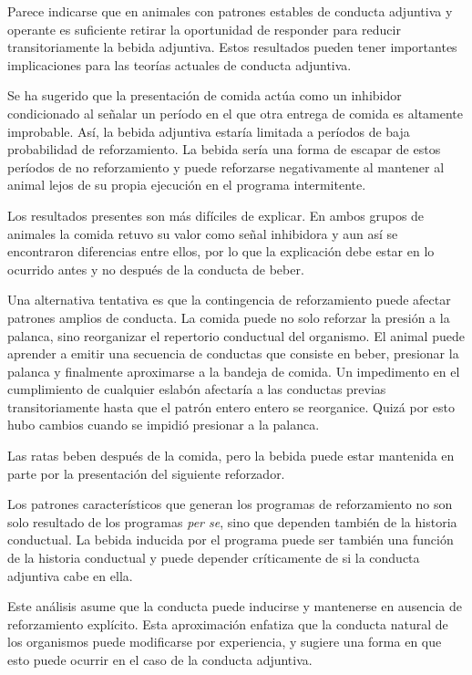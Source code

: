 \documentclass[a4paper,12pt]{article}
\begin{document}
Parece indicarse que en animales con patrones estables de conducta adjuntiva y operante es suficiente retirar la oportunidad de responder para reducir transitoriamente la bebida adjuntiva. Estos resultados pueden tener importantes implicaciones para las teorías actuales de conducta adjuntiva.

Se ha sugerido que la presentación de comida actúa como un inhibidor condicionado al señalar un período en el que otra entrega de comida es altamente improbable. Así, la bebida adjuntiva estaría limitada a períodos de baja probabilidad de reforzamiento. La bebida sería una forma de escapar de estos períodos de no reforzamiento y puede reforzarse negativamente al mantener al animal lejos de su propia ejecución en el programa intermitente.

Los resultados presentes son más difíciles de explicar. En ambos grupos de animales la comida retuvo su valor como señal inhibidora y aun así se encontraron diferencias entre ellos, por lo que la explicación debe estar en lo ocurrido antes y no después de la conducta de beber.

Una alternativa tentativa es que la contingencia de reforzamiento puede afectar patrones amplios de conducta. La comida puede no solo reforzar la presión a la palanca, sino reorganizar el repertorio conductual del organismo. El animal puede aprender a emitir una secuencia de conductas que consiste en beber, presionar la palanca y finalmente aproximarse a la bandeja de comida. Un impedimento en el cumplimiento de cualquier eslabón afectaría a las conductas previas transitoriamente hasta que el patrón entero entero se reorganice. Quizá por esto hubo cambios cuando se impidió presionar a la palanca.

Las ratas beben después de la comida, pero la bebida puede estar mantenida en parte por la presentación del siguiente reforzador.

Los patrones característicos que generan los programas de reforzamiento no son solo resultado de los programas {\itshape per se}, sino que dependen también de la historia conductual. La bebida inducida por el programa puede ser también una función de la historia conductual y puede depender críticamente de si la conducta adjuntiva cabe en ella.

Este análisis asume que la conducta puede inducirse y mantenerse en ausencia de reforzamiento explícito. Esta aproximación enfatiza que la conducta natural de los organismos puede modificarse por experiencia, y sugiere una forma en que esto puede ocurrir en el caso de la conducta adjuntiva.
\end{document}
